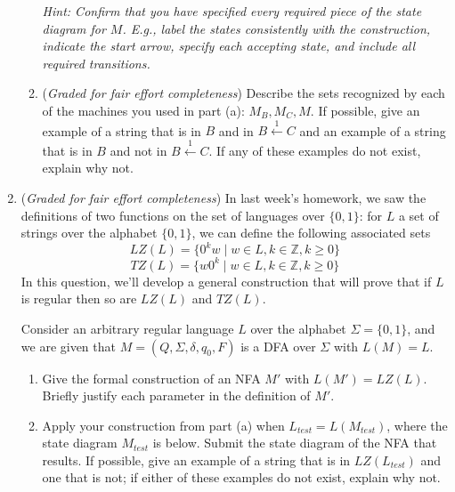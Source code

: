 \begin{enumerate}
\begin{enumerate}
{\it Hint: Confirm that you have specified every required piece of the state diagram for $M$. E.g., 
label the states consistently with the construction, indicate the start arrow, specify each
accepting state, and include all required transitions.}

\item ({\it Graded for fair effort completeness})  Describe the sets recognized by each of the 
machines you used in part (a): $M_B, M_C, M$.
If possible, give an example of a string that is in $B$ and in $B \overset{1}{\leftarrow} C$
and an example of a string that is in $B$ and not in $B \overset{1}{\leftarrow} C$. If any of these examples
do not exist, explain why not.
\end{enumerate}


\item ({\it Graded for fair effort completeness}) In last week's homework, 
we saw the definitions of two functions on the set of languages over $\{0,1\}$:
for $L$ a set of strings over the alphabet $\{0,1\}$, we can define the following associated sets
\[
LZ(L) = \{ 0^k w \mid w \in L, k \in \mathbb{Z}, k \geq 0 \}
\]
\[
TZ(L) = \{ w 0^k \mid w \in L, k \in \mathbb{Z}, k \geq 0 \}
\]
In this question, we'll develop a general construction that will prove
that if $L$ is regular then so are $LZ(L)$ and $TZ(L)$.

Consider an arbitrary regular
language $L$ over the alphabet $\Sigma = \{0,1\}$, and we are given that
$M = (Q, \Sigma, \delta, q_0, F)$ is a DFA over $\Sigma$ with $L(M) = L$.

\begin{enumerate}
\item Give the formal construction of an NFA $M'$ with $L(M') = LZ(L)$.  Briefly justify 
each parameter in the definition of  $M'$.
\item Apply your construction from part (a) when $L_{test} = L(M_{test})$, where the 
state diagram $M_{test}$ is below.  Submit the state diagram of the NFA that results.
If possible, give an example of a string that is in $LZ(L_{test})$ and one that is not; if either of these examples
do not exist, explain why not.


\end{enumerate}
\end{enumerate}
